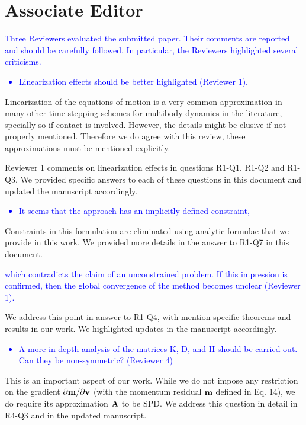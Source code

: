 \section{Associate Editor}
\label{sec:associate_editor}

\textcolor{blue}{Three Reviewers evaluated the submitted paper. Their comments
are reported and should be carefully followed. In particular, the Reviewers
highlighted several criticisms.}
\textcolor{blue}{\begin{itemize}
    \item Linearization effects should be better highlighted (Reviewer 1).
\end{itemize}}
Linearization of the equations of motion is a very common approximation in many
other time stepping schemes for multibody dynamics in the literature, specially
so if contact is involved. However, the details might be elusive if not properly
mentioned. Therefore we do agree with this review, these approximations must be
mentioned explicitly.

Reviewer 1 comments on linearization effects in questions R1-Q1, R1-Q2 and
R1-Q3. We provided specific answers to each of these questions in this document
and updated the manuscript accordingly. 

\textcolor{blue}{\begin{itemize}
    \item It seems that the approach has an implicitly defined constraint,
\end{itemize}}
Constraints in this formulation are eliminated using analytic formulae that we
provide in this work. We provided more details in the answer to R1-Q7 in this
document.

\textcolor{blue}{which contradicts the claim of an unconstrained problem. If
this impression is confirmed, then the global convergence of the method becomes
unclear (Reviewer 1).}

We address this point in answer to R1-Q4, with mention specific theorems and
results in our work. We highlighted updates in the manuscript accordingly.

\textcolor{blue}{
\begin{itemize}
    \item A more in-depth analysis of the matrices K, D, and H should be
    carried out. Can they be non-symmetric? (Reviewer 4)
\end{itemize}}

This is an important aspect of our work. While we do not impose any restriction
on the gradient $\partial {\mathbf{m}}/\partial {\mathbf{v}}$ (with the momentum residual
${\mathbf{m}}$ defined in Eq. 14), we do require its approximation ${\mathbf{A}}$ to be SPD.
We address this question in detail in R4-Q3 and in the updated manuscript.



